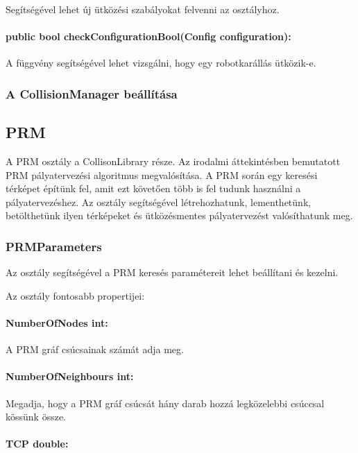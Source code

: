 Segítségével lehet új ütközési szabályokat felvenni az osztályhoz.
 
\paragraph{public bool checkConfigurationBool(Config configuration):}

A függvény segítségével lehet vizsgálni, hogy egy robotkarállás ütközik-e.
\linebreak

\subsubsection*{A CollisionManager beállítása}



\subsection{PRM}

A PRM osztály a CollisonLibrary része. Az irodalmi áttekintésben bemutatott PRM pályatervezési algoritmus megvalósítása. A PRM során egy keresési térképet építünk fel, amit ezt követően több is fel tudunk használni a pályatervezéshez. Az osztály segítségével létrehozhatunk, lementhetünk, betölthetünk ilyen térképeket és ütközésmentes pályatervezést valósíthatunk meg.


\subsubsection*{PRMParameters}

Az osztály segítségével a PRM keresés paramétereit lehet beállítani és kezelni.

Az osztály fontosabb propertijei:

\paragraph{NumberOfNodes int: } 

A PRM gráf csúcsainak számát adja meg.

\paragraph{NumberOfNeighbours int:}

Megadja, hogy a PRM gráf csúcsát hány darab hozzá legközelebbi csúccsal kössünk össze.

\paragraph{TCP double:} 

